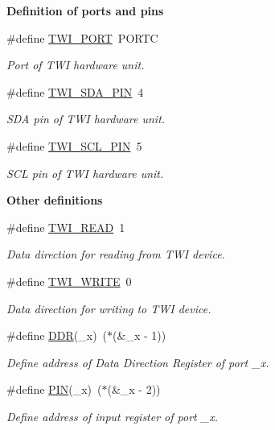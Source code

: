\begin{Indent}{\bf Definition of ports and pins}\par
\begin{DoxyCompactItemize}
\item 
\#define \hyperlink{a00008_ga762c164f4acd04d3ce3627fe73e7c018}{T\+W\+I\+\_\+\+P\+O\+RT}~P\+O\+R\+TC
\begin{DoxyCompactList}\small\item\em Port of T\+WI hardware unit. \end{DoxyCompactList}\item 
\#define \hyperlink{a00008_ga3f14ed8491293d0dda1372cceaa39851}{T\+W\+I\+\_\+\+S\+D\+A\+\_\+\+P\+IN}~4
\begin{DoxyCompactList}\small\item\em S\+DA pin of T\+WI hardware unit. \end{DoxyCompactList}\item 
\#define \hyperlink{a00008_gac0ad8b33f1be48e211f1eeae2dd65cee}{T\+W\+I\+\_\+\+S\+C\+L\+\_\+\+P\+IN}~5
\begin{DoxyCompactList}\small\item\em S\+CL pin of T\+WI hardware unit. \end{DoxyCompactList}\end{DoxyCompactItemize}
\end{Indent}
\begin{Indent}{\bf Other definitions}\par
\begin{DoxyCompactItemize}
\item 
\#define \hyperlink{a00008_gaaf9a8abccd811954f9cc316f2b2f87b3}{T\+W\+I\+\_\+\+R\+E\+AD}~1
\begin{DoxyCompactList}\small\item\em Data direction for reading from T\+WI device. \end{DoxyCompactList}\item 
\#define \hyperlink{a00008_ga3b68e8e777b71520f9dbfac733774d5f}{T\+W\+I\+\_\+\+W\+R\+I\+TE}~0
\begin{DoxyCompactList}\small\item\em Data direction for writing to T\+WI device. \end{DoxyCompactList}\item 
\#define \hyperlink{a00008_ga6c0346728feb274834cad94daca316ee}{D\+DR}(\+\_\+x)~($\ast$(\&\+\_\+x -\/ 1))
\begin{DoxyCompactList}\small\item\em Define address of Data Direction Register of port \+\_\+x. \end{DoxyCompactList}\item 
\#define \hyperlink{a00008_ga740f9eb9c9f9e33500ee61ec53945f6a}{P\+IN}(\+\_\+x)~($\ast$(\&\+\_\+x -\/ 2))
\begin{DoxyCompactList}\small\item\em Define address of input register of port \+\_\+x. \end{DoxyCompactList}\end{DoxyCompactItemize}
\end{Indent}
